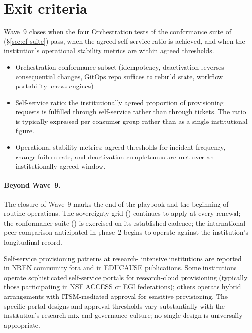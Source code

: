 \section{Exit criteria}
\label{sec:w9-exit}

Wave~9 closes when the four Orchestration tests of the
conformance suite of 
(\S\ref{sec:cf-suite}) pass, when the agreed self-service
ratio is achieved, and when the institution's operational
stability metrics are within agreed thresholds.

\begin{itemize}[leftmargin=1.5em,nosep]
  \item Orchestration conformance subset (idempotency,
    deactivation reverses consequential changes, GitOps repo
    suffices to rebuild state, workflow portability across
    engines).
  \item Self-service ratio: the institutionally agreed
    proportion of provisioning requests is fulfilled through
    self-service rather than through tickets. The ratio is
    typically expressed per consumer group rather than as a
    single institutional figure.
  \item Operational stability metrics: agreed thresholds for
    incident frequency, change-failure rate, and deactivation
    completeness are met over an institutionally agreed
    window.
\end{itemize}

\paragraph{Beyond Wave~9.} The closure of Wave~9 marks the end
of the playbook and the beginning of routine operations. The
sovereignty grid () continues to
apply at every renewal; the conformance suite
() is exercised on its established
cadence; the international peer comparison anticipated in
phase~2 begins to operate against the institution's
longitudinal record.

\begin{realworldbox}
\noindent Self-service provisioning patterns at research-
intensive institutions are reported in NREN community fora and
in EDUCAUSE publications. Some institutions operate
sophisticated self-service portals for research-cloud
provisioning (typically those participating in NSF ACCESS or
EGI federations); others operate hybrid arrangements with
ITSM-mediated approval for sensitive provisioning. The
specific portal designs and approval thresholds vary
substantially with the institution's research mix and
governance culture; no single design is universally
appropriate.
\end{realworldbox}


